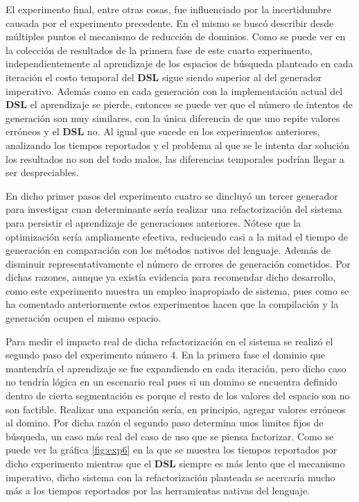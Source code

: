 
El experimento final, entre otras cosas, fue influenciado por la incertidumbre causada por el experimento precedente.
En el mismo se buscó describir desde múltiples puntos el mecanismo de reducción de dominios. Como se puede ver en la
colección de resultados de la primera fase de este cuarto experimento, independientemente
al aprendizaje de los espacios de búsqueda planteado en cada iteración el costo temporal del {\bf DSL} sigue siendo superior
al del generador imperativo. Además como en cada generación con la implementación actual del {\bf DSL} el aprendizaje se pierde,
entonces se puede ver que el número de intentos de generación son muy similares, con la única diferencia de que uno repite
valores erróneos y el {\bf DSL} no. Al igual que sucede en los experimentos anteriores, analizando los tiempos reportados y el problema
al que se le intenta dar solución los resultados no son del todo malos, las diferencias temporales podrían llegar a ser
despreciables.

En dicho primer pasos del experimento cuatro se dincluyó un tercer generador para investigar cuan determinante sería
realizar una refactorización del sistema para persistir el aprendizaje de generaciones anteriores. Nótese que la optimización
sería ampliamente efectiva, reduciendo casi a la mitad el tiempo de generación en comparación con los métodos nativos del
lenguaje. Además de disminuir representativamente el número de errores de generación cometidos. Por dichas
razones, aunque ya existía evidencia para recomendar dicho desarrollo, como este experimento muestra un empleo inapropiado de
sistema, pues como se ha comentado anteriormente estos experimentos hacen que la compilación y la generación ocupen el mismo
espacio.

Para medir el impacto real de dicha refactorización en el sistema se realizó el segundo paso del experimento número 4. En la
primera fase el dominio que mantendría el aprendizaje se fue expandiendo en cada iteración, pero dicho caso no tendría lógica
en un escenario real pues si un domino se encuentra definido dentro de cierta segmentación es porque el resto de los valores
del espacio son no son factible. Realizar una expanción sería, en principio, agregar valores erróneos al domino. Por dicha razón
el segundo paso determina unos limites fijos de búsqueda, un caso más real del caso de uso que se piensa factorizar. Como se
puede ver la gráfica \ref{fig:exp6} en la que se muestra los tiempos reportados por dicho experimento mientras que el {\bf DSL} siempre es más lento
que el mecanismo imperativo, dicho sistema con la refactorización planteada se acercaría mucho más a los tiempos reportados por
las herramientas nativas del lenguaje.

